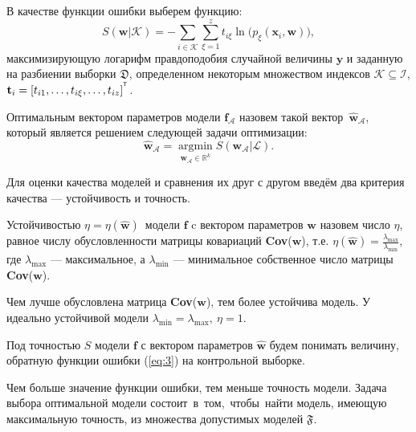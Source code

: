 \documentclass[12pt]{article}
\begin{document}
В качестве функции ошибки выберем функцию:
\begin{equation}
\label{eq:3}
S(\mathbf{w}|\mathcal{K}) = - \sum_{i \in \mathcal{K}} \sum_{\xi = 1}^{z} t_{i{\xi}}\ln \bigl( p_{\xi}(\mathbf{x}_i, \mathbf{w}) \bigr),
\end{equation}
максимизирующую логарифм правдоподобия случайной величины $\mathbf{y}$ и заданную на разбиении выборки $\mathfrak{D}$, определенном некоторым множеством индексов $\mathcal{K} \subseteq \mathcal{I}$, $\mathbf{t}_i = [t_{i1},\dots,t_{i\xi},\dots,t_{iz}]^{^{\text{\tiny\sffamily\upshape\mdseries T}}}$.
\begin{Def}
Оптимальным вектором параметров модели $\mathbf{f}_{\mathcal{A}}$  назовем такой вектор~$\mathbf{\hat{w}}_{\mathcal{A}}$, который является решением следующей задачи оптимизации:
\begin{equation}
\label{eq:4}
\mathbf{\hat{w}}_{\mathcal{A}} = \mathop{\text{argmin}}\limits_{{\mathbf{w}_{\mathcal{A}} \in \mathbb{R}^k}}S(\mathbf{w}_\mathcal{A}|\mathcal{L}).
\end{equation}
\end{Def}
Для оценки качества моделей и сравнения их друг с другом введём два критерия качества --- устойчивость и точность.
\begin{Def}
Устойчивостью $\eta = \eta(\mathbf{\hat{w}})$~модели $\mathbf{f}$ c вектором параметров $\mathbf{w}$ назовем число $\eta$, равное числу обусловленности матрицы ковариаций \textbf{Cov}($\mathbf{w}$), т.е. $\eta(\mathbf{\hat{w}})=\frac{\lambda_{\max}}{\lambda_{\min}}$, где $\lambda_{\max}$ --- максимальное, а $\lambda_{\min}$ --- минимальное собственное число матрицы \textbf{Cov}($\mathbf{w}$).
\end{Def}
Чем лучше обусловлена матрица \textbf{Cov}($\mathbf{w}$), тем более устойчива модель. У идеально устойчивой модели $\lambda_{\min} = \lambda_{\max},~\eta = 1$.
\begin{Def}
Под точностью $S$ модели $\mathbf{f}$ с вектором параметров $\mathbf{\hat{w}}$ будем понимать величину, обратную функции ошибки (\ref{eq:3}) на контрольной выборке.
\end{Def}
Чем больше значение функции ошибки, тем меньше точность модели. Задача выбора оптимальной модели состоит~в~том,~чтобы~найти модель, имеющую максимальную точность, из множества допустимых моделей $\mathfrak{F}$.
\end{document}
